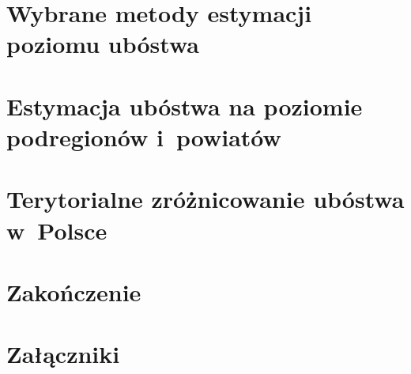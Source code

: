 \documentclass[11pt,twoside]{report}
\begin{document}
\chapter{Wybrane metody estymacji poziomu ubóstwa}


\chapter{Estymacja ubóstwa na poziomie podregionów i~powiatów}


\chapter{Terytorialne zróżnicowanie ubóstwa w~Polsce}


\chapter*{Zakończenie}


\clearpage
{}
{}

%


\chapter*{Załączniki}
\appendix
\renewcommand{\thesection}{\Alph{section}}


\end{document}
